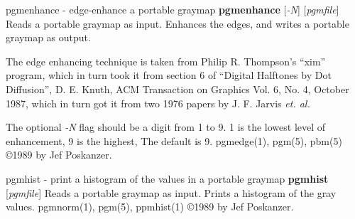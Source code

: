 pgmenhance - edge-enhance a portable graymap
{\bf pgmenhance}
{\rm [}{\it -N}{\rm ]}
{\rm [}{\it pgmfile}{\rm ]}
Reads a portable graymap as input.
Enhances the edges, and writes a portable graymap as output.
\par
The edge enhancing technique is taken from Philip R. Thompson's ``xim''
program, which in turn took it from section 6 of ``Digital Halftones by
Dot Diffusion'', D. E. Knuth, ACM Transaction on Graphics Vol. 6, No. 4,
October 1987, which in turn got it from two 1976 papers by J. F. Jarvis
{\it et. al.}
\par
The optional
{\it -N}
flag should be a digit from 1 to 9.
1 is the lowest level of enhancement, 9 is the highest,
The default is 9.
pgmedge(1), pgm(5), pbm(5)
\copyright 1989 by Jef Poskanzer.
%
 
%

\newpage
%

pgmhist - print a histogram of the values in a portable graymap
{\bf pgmhist}
{\rm [}{\it pgmfile}{\rm ]}
Reads a portable graymap as input.
Prints a histogram of the gray values.
pgmnorm(1), pgm(5), ppmhist(1)
\copyright 1989 by Jef Poskanzer.
%
 
